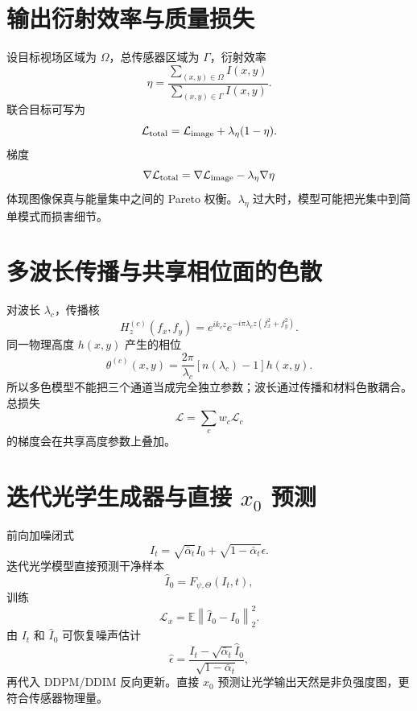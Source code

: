 \documentclass[UTF8,12pt,a4paper,fontset=none]{ctexart}
\numberwithin{equation}{section}
\newcommand{\E}{\mathbb{E}}
\newcommand{\Loss}{\mathcal{L}}
\newcommand{\norm}[1]{\left\lVert #1\right\rVert}
\begin{document}
\section{输出衍射效率与质量损失}
设目标视场区域为 $\Omega$，总传感器区域为 $\Gamma$，衍射效率
\begin{equation}
 \eta=\frac{\sum_{(x,y)\in\Omega}I(x,y)}
 {\sum_{(x,y)\in\Gamma}I(x,y)}.
\end{equation}
联合目标可写为
\begin{equation}
 \Loss_{\rm total}=\Loss_{\rm image}+\lambda_\eta(1-\eta).
\end{equation}
梯度
\begin{equation}
 \nabla\Loss_{\rm total}=\nabla\Loss_{\rm image}-\lambda_\eta\nabla\eta
\end{equation}
体现图像保真与能量集中之间的 Pareto 权衡。$\lambda_\eta$ 过大时，模型可能把光集中到简单模式而损害细节。

\section{多波长传播与共享相位面的色散}
对波长 $\lambda_c$，传播核
\begin{equation}
 H_z^{(c)}(f_x,f_y)=e^{ik_cz}
 e^{-i\pi\lambda_c z(f_x^2+f_y^2)}.
\end{equation}
同一物理高度 $h(x,y)$ 产生的相位
\begin{equation}
 \theta^{(c)}(x,y)=\frac{2\pi}{\lambda_c}[n(\lambda_c)-1]h(x,y).
\end{equation}
所以多色模型不能把三个通道当成完全独立参数；波长通过传播和材料色散耦合。总损失
\begin{equation}
 \Loss=\sum_cw_c\Loss_c
\end{equation}
的梯度会在共享高度参数上叠加。

\section{迭代光学生成器与直接 $x_0$ 预测}
前向加噪闭式
\begin{equation}
 I_t=\sqrt{\bar\alpha_t}I_0+\sqrt{1-\bar\alpha_t}\epsilon.
\end{equation}
迭代光学模型直接预测干净样本
\begin{equation}
 \widehat I_0=F_{\psi,\Theta}(I_t,t),
\end{equation}
训练
\begin{equation}
 \Loss_x=\E\norm{\widehat I_0-I_0}_2^2.
\end{equation}
由 $I_t$ 和 $\widehat I_0$ 可恢复噪声估计
\begin{equation}
 \widehat\epsilon=\frac{I_t-\sqrt{\bar\alpha_t}\widehat I_0}{\sqrt{1-\bar\alpha_t}},
\end{equation}
再代入 DDPM/DDIM 反向更新。直接 $x_0$ 预测让光学输出天然是非负强度图，更符合传感器物理量。
\end{document}
